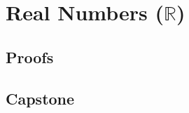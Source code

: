\chapter{Real Numbers ($\mathbb{R}$)}

\clearpage

\clearpage


\section*{Proofs}


\section*{Capstone}


